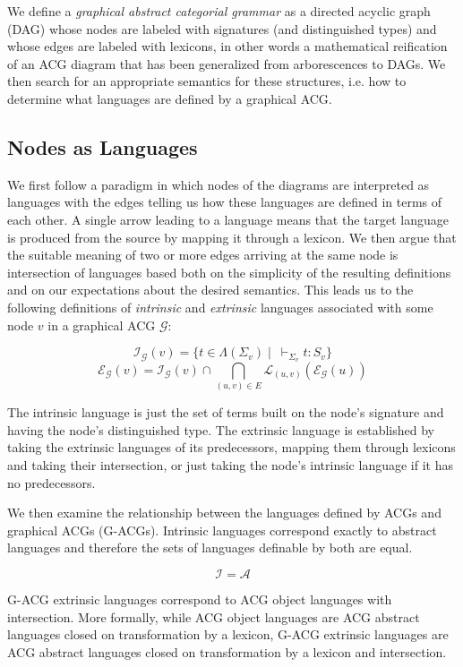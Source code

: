 \documentclass{llncs}
\begin{document}
We define a \emph{graphical abstract categorial grammar} as a directed acyclic
graph (DAG) whose nodes are labeled with signatures (and distinguished types)
and whose edges are labeled with lexicons, in other words a mathematical
reification of an ACG diagram that has been generalized from
arborescences to DAGs. We then search for an appropriate semantics for these
structures, i.e. how to determine what languages are defined by a graphical
ACG.

\subsection{Nodes as Languages}

We first follow a paradigm in which nodes of the diagrams are
interpreted as languages with the edges telling us how these languages
are defined in terms of each other. A single arrow leading to a language
means that the target language is produced from the source by mapping it
through a lexicon. We then argue that the suitable meaning of two or
more edges arriving at the same node is intersection of languages based
both on the simplicity of the resulting definitions and on our
expectations about the desired semantics. This leads us to the following
definitions of \emph{intrinsic} and \emph{extrinsic} languages
associated with some node $v$ in a graphical ACG $\mathcal{G}$:

$$
\mathcal{I}_{\mathcal{G}}(v) = \{t \in \Lambda(\Sigma_v)
\mid\ \vdash_{\Sigma_v} t : S_v\}
$$
$$
\mathcal{E}_{\mathcal{G}}(v) = \mathcal{I}_{\mathcal{G}}(v) \cap
\bigcap_{(u,v) \in E} \mathcal{L}_{(u,v)}(\mathcal{E}_{\mathcal{G}}(u))
$$

The intrinsic language is just the set of terms built on the node's
signature and having the node's distinguished type. The extrinsic
language is established by taking the extrinsic languages of its
predecessors, mapping them through lexicons and taking their
intersection, or just taking the node's intrinsic language if it has no
predecessors.

We then examine the relationship between the languages defined by ACGs
and graphical ACGs (G-ACGs). Intrinsic languages correspond exactly to
abstract languages and therefore the sets of languages definable by both
are equal.

$$
\mathcal{I} = \mathcal{A}
$$

G-ACG extrinsic languages correspond to ACG object languages with
intersection. More formally, while ACG object languages are ACG abstract
languages closed on transformation by a lexicon, G-ACG extrinsic languages are
ACG abstract languages closed on transformation by a lexicon and intersection.
\end{document}
